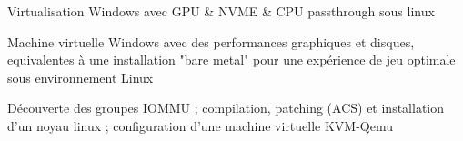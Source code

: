 \begin{cventries}
  \cventry
    {} %
    {Virtualisation Windows avec GPU \& NVME \& CPU passthrough sous linux} %
    {} %
    {} %
    {
      \begin{cvitems} %
        \item {Machine virtuelle Windows avec des performances graphiques et disques, equivalentes à une installation "bare metal" pour une expérience de jeu optimale sous environnement Linux}
        \item {Découverte des groupes IOMMU ; compilation, patching (ACS) et installation d'un noyau linux ; configuration d'une machine virtuelle KVM-Qemu\\}
      \end{cvitems}
    }
\end{cventries}